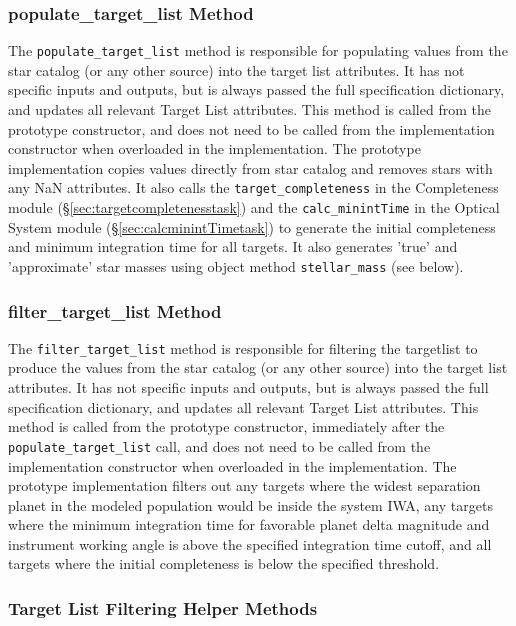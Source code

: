 \documentclass[cleanfoot]{asme2ej}
\begin{document}
\subsubsection{populate\_target\_list Method} \label{sec:populatetargetlisttask}

The \verb+populate_target_list+ method is responsible for populating values from the star catalog  (or any other source) into the target list attributes. It has not specific inputs and outputs, but is always passed the full specification dictionary, and updates all relevant Target List attributes.  This method is called from the prototype constructor, and does not need to be called from the implementation constructor when overloaded in the implementation.   The prototype implementation copies values directly from star catalog and removes stars with any NaN attributes. It also calls the \verb+target_completeness+ in the Completeness module (\S\ref{sec:targetcompletenesstask}) and the \verb+calc_minintTime+ in the Optical System module (\S\ref{sec:calcminintTimetask}) to generate the initial completeness and minimum integration time for all targets.  It also generates 'true' and 'approximate' star masses using object method \verb+stellar_mass+ (see below).

\subsubsection{filter\_target\_list Method}  \label{sec:filtertargetlisttask}
The \verb+filter_target_list+ method is responsible for filtering the targetlist to produce the values from the star catalog  (or any other source) into the target list attributes. It has not specific inputs and outputs, but is always passed the full specification dictionary, and updates all relevant Target List attributes.  This method is called from the prototype constructor, immediately after the \verb+populate_target_list+ call, and does not need to be called from the implementation constructor when overloaded in the implementation.   The prototype implementation filters out any targets where the widest separation planet in the modeled population would be inside the system IWA, any targets where the minimum integration time for favorable planet delta magnitude and instrument working angle is above the specified integration time cutoff, and all targets where the initial completeness is below the specified threshold. 

\subsubsection{Target List Filtering Helper Methods} \label{sec:filteringhelpertask}
\end{document}
